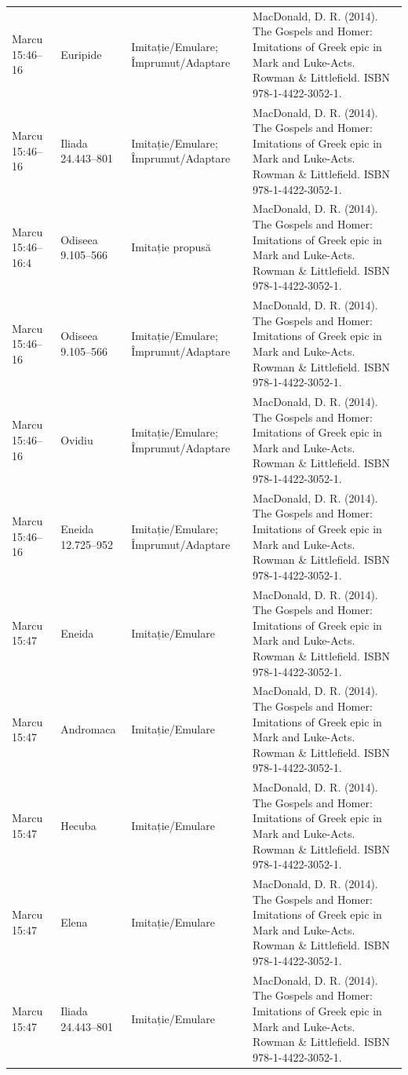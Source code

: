 \documentclass[12pt,a4paper,twoside,openany]{book}
\begin{document}
\begin{longtable}{L{1.4cm}L{1.7cm}L{3.1cm}L{8.4cm}}
Marcu 15:46–16 & Euripide & Imitație/Emulare; Împrumut/Adaptare & MacDonald, D. R. (2014). The Gospels and Homer: Imitations of Greek epic in Mark and Luke-Acts. Rowman \& Littlefield. ISBN 978-1-4422-3052-1. \\
Marcu 15:46–16 & Iliada 24.443–801 & Imitație/Emulare; Împrumut/Adaptare & MacDonald, D. R. (2014). The Gospels and Homer: Imitations of Greek epic in Mark and Luke-Acts. Rowman \& Littlefield. ISBN 978-1-4422-3052-1. \\
Marcu 15:46–16:4 & Odiseea 9.105–566 & Imitație propusă & MacDonald, D. R. (2014). The Gospels and Homer: Imitations of Greek epic in Mark and Luke-Acts. Rowman \& Littlefield. ISBN 978-1-4422-3052-1. \\
Marcu 15:46–16 & Odiseea 9.105–566 & Imitație/Emulare; Împrumut/Adaptare & MacDonald, D. R. (2014). The Gospels and Homer: Imitations of Greek epic in Mark and Luke-Acts. Rowman \& Littlefield. ISBN 978-1-4422-3052-1. \\
Marcu 15:46–16 & Ovidiu & Imitație/Emulare; Împrumut/Adaptare & MacDonald, D. R. (2014). The Gospels and Homer: Imitations of Greek epic in Mark and Luke-Acts. Rowman \& Littlefield. ISBN 978-1-4422-3052-1. \\
Marcu 15:46–16 & Eneida 12.725–952 & Imitație/Emulare; Împrumut/Adaptare & MacDonald, D. R. (2014). The Gospels and Homer: Imitations of Greek epic in Mark and Luke-Acts. Rowman \& Littlefield. ISBN 978-1-4422-3052-1. \\
Marcu 15:47 & Eneida & Imitație/Emulare & MacDonald, D. R. (2014). The Gospels and Homer: Imitations of Greek epic in Mark and Luke-Acts. Rowman \& Littlefield. ISBN 978-1-4422-3052-1. \\
Marcu 15:47 & Andromaca & Imitație/Emulare & MacDonald, D. R. (2014). The Gospels and Homer: Imitations of Greek epic in Mark and Luke-Acts. Rowman \& Littlefield. ISBN 978-1-4422-3052-1. \\
Marcu 15:47 & Hecuba & Imitație/Emulare & MacDonald, D. R. (2014). The Gospels and Homer: Imitations of Greek epic in Mark and Luke-Acts. Rowman \& Littlefield. ISBN 978-1-4422-3052-1. \\
Marcu 15:47 & Elena & Imitație/Emulare & MacDonald, D. R. (2014). The Gospels and Homer: Imitations of Greek epic in Mark and Luke-Acts. Rowman \& Littlefield. ISBN 978-1-4422-3052-1. \\
Marcu 15:47 & Iliada 24.443–801 & Imitație/Emulare & MacDonald, D. R. (2014). The Gospels and Homer: Imitations of Greek epic in Mark and Luke-Acts. Rowman \& Littlefield. ISBN 978-1-4422-3052-1. \\

\end{longtable}
\end{document}

